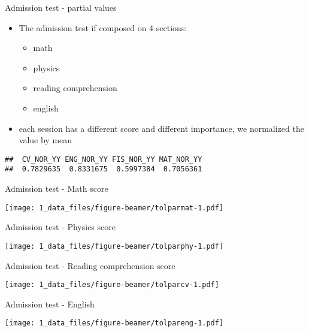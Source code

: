 \documentclass[
  ignorenonframetext,
]{beamer}
\providecommand{\tightlist}{%
  \setlength{\itemsep}{0pt}\setlength{\parskip}{0pt}}
\begin{document}
\begin{frame}[fragile]{Admission test - partial values}
\protect\hypertarget{admission-test---partial-values}{}

\begin{itemize}
\tightlist
\item
  The admission test if composed on 4 sections:

  \begin{itemize}
  \tightlist
  \item
    math
  \item
    physics
  \item
    reading comprehension
  \item
    english
  \end{itemize}
\item
  each session has a different score and different importance, we
  normalized the value by mean
\end{itemize}

\begin{verbatim}
##  CV_NOR_YY ENG_NOR_YY FIS_NOR_YY MAT_NOR_YY 
##  0.7829635  0.8331675  0.5997384  0.7056361
\end{verbatim}

\end{frame}

\begin{frame}{Admission test - Math score}
\protect\hypertarget{admission-test---math-score}{}

\texttt{[image: 1\_data\_files/figure-beamer/tolparmat-1.pdf]}

\end{frame}

\begin{frame}{Admission test - Physics score}
\protect\hypertarget{admission-test---physics-score}{}

\texttt{[image: 1\_data\_files/figure-beamer/tolparphy-1.pdf]}

\end{frame}

\begin{frame}{Admission test - Reading comprehension score}
\protect\hypertarget{admission-test---reading-comprehension-score}{}

\texttt{[image: 1\_data\_files/figure-beamer/tolparcv-1.pdf]}

\end{frame}

\begin{frame}{Admission test - English}
\protect\hypertarget{admission-test---english}{}

\texttt{[image: 1\_data\_files/figure-beamer/tolpareng-1.pdf]}

\end{frame}
\end{document}
